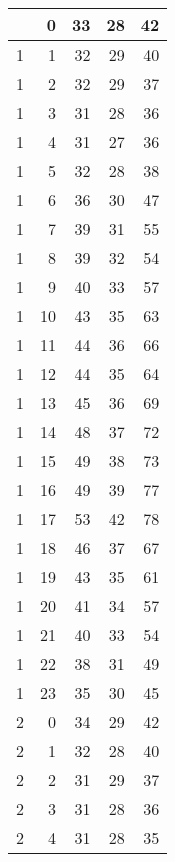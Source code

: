     \begin{longtable}{|r|r|r|r|r|}
		\centering
    1     & 0     & 33    & 28    & 42 \\\hline
    1     & 1     & 32    & 29    & 40 \\\hline
    1     & 2     & 32    & 29    & 37 \\\hline
    1     & 3     & 31    & 28    & 36 \\\hline
    1     & 4     & 31    & 27    & 36 \\\hline
    1     & 5     & 32    & 28    & 38 \\\hline
    1     & 6     & 36    & 30    & 47 \\\hline
    1     & 7     & 39    & 31    & 55 \\\hline
    1     & 8     & 39    & 32    & 54 \\\hline
    1     & 9     & 40    & 33    & 57 \\\hline
    1     & 10    & 43    & 35    & 63 \\\hline
    1     & 11    & 44    & 36    & 66 \\\hline
    1     & 12    & 44    & 35    & 64 \\\hline
    1     & 13    & 45    & 36    & 69 \\\hline
    1     & 14    & 48    & 37    & 72 \\\hline
    1     & 15    & 49    & 38    & 73 \\\hline
    1     & 16    & 49    & 39    & 77 \\\hline
    1     & 17    & 53    & 42    & 78 \\\hline
    1     & 18    & 46    & 37    & 67 \\\hline
    1     & 19    & 43    & 35    & 61 \\\hline
    1     & 20    & 41    & 34    & 57 \\\hline
    1     & 21    & 40    & 33    & 54 \\\hline
    1     & 22    & 38    & 31    & 49 \\\hline
    1     & 23    & 35    & 30    & 45 \\\hline
    2     & 0     & 34    & 29    & 42 \\\hline
    2     & 1     & 32    & 28    & 40 \\\hline
    2     & 2     & 31    & 29    & 37 \\\hline
    2     & 3     & 31    & 28    & 36 \\\hline
    2     & 4     & 31    & 28    & 35 \\\hline

\end{longtable}
